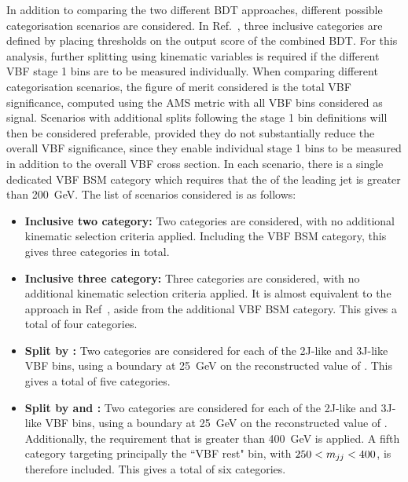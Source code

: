 In addition to comparing the two different BDT approaches, 
different possible categorisation scenarios are considered.
In Ref.~\cite{HIG-16-040}, three inclusive categories are defined 
by placing thresholds on the output score of the combined BDT.
For this analysis, further splitting using kinematic variables is required 
if the different VBF stage 1 bins are to be measured individually.
When comparing different categorisation scenarios,
the figure of merit considered is the total VBF significance, 
computed using the AMS metric with all VBF bins considered as signal.
Scenarios with additional splits following the stage 1 bin definitions 
will then be considered preferable, 
provided they do not substantially reduce the overall VBF significance, 
since they enable individual stage 1 bins to be measured in addition to the overall VBF cross section.
In each scenario, there is a single dedicated VBF BSM category 
which requires that the \pt of the leading jet is greater than \SI{200}{GeV}.
The list of scenarios considered is as follows:
\begin{itemize}
\item \textbf{Inclusive two category:} Two categories are considered, 
      with no additional kinematic selection criteria applied.
      Including the VBF BSM category, this gives three categories in total.
\item \textbf{Inclusive three category:} Three categories are considered, 
      with no additional kinematic selection criteria applied.
      It is almost equivalent to the approach in Ref~\cite{HIG-16-040}, 
      aside from the additional VBF BSM category.
      This gives a total of four categories.
\item \textbf{Split by \ptHjj:} Two categories are considered 
      for each of the 2J-like and 3J-like VBF bins,
      using a boundary at \SI{25}{GeV} on the reconstructed value of \ptHjj.
      This gives a total of five categories.
\item \textbf{Split by \ptHjj and \mjj:} Two categories are considered
      for each of the 2J-like and 3J-like VBF bins,
      using a boundary at \SI{25}{GeV} on the reconstructed value of \ptHjj.
      Additionally, the requirement that \mjj is greater than \SI{400}{GeV} is applied.
      A fifth category targeting principally the ``VBF rest" bin, with $250 < m_{jj} < 400$,
      is therefore included.
      This gives a total of six categories.
\end{itemize}

